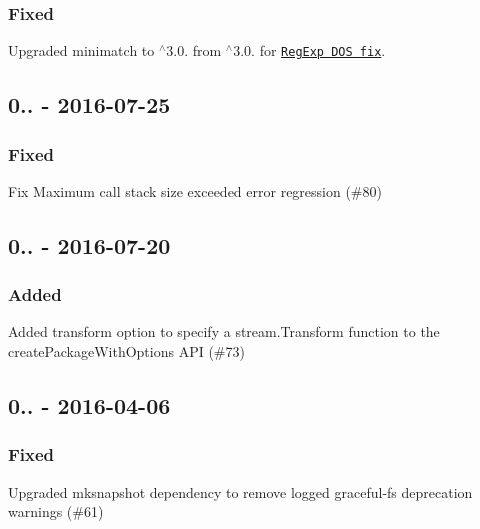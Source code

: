 \subsubsection*{Fixed}


\begin{DoxyItemize}
\item Upgraded {\ttfamily minimatch} to {\ttfamily $^\wedge$3.0.} from {\ttfamily $^\wedge$3.0.} for \href{https://nodesecurity.io/advisories/minimatch_regular-expression-denial-of-service}{\tt Reg\+Exp D\+OS fix}.
\end{DoxyItemize}

\subsection*{0.. -\/ 2016-\/07-\/25}

\subsubsection*{Fixed}


\begin{DoxyItemize}
\item Fix {\ttfamily Maximum call stack size exceeded} error regression (\#80)
\end{DoxyItemize}

\subsection*{0.. -\/ 2016-\/07-\/20}

\subsubsection*{Added}


\begin{DoxyItemize}
\item Added {\ttfamily transform} option to specify a {\ttfamily stream.\+Transform} function to the {\ttfamily create\+Package\+With\+Options} A\+PI (\#73)
\end{DoxyItemize}

\subsection*{0.. -\/ 2016-\/04-\/06}

\subsubsection*{Fixed}


\begin{DoxyItemize}
\item Upgraded {\ttfamily mksnapshot} dependency to remove logged {\ttfamily graceful-\/fs} deprecation warnings (\#61) 
\end{DoxyItemize}